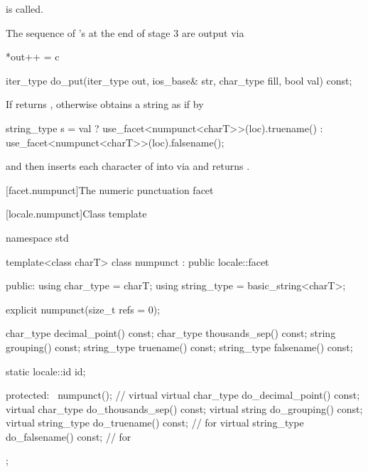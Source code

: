 \begin{itemdescr}
\begin{description}
is called.

The sequence of
's
at the end of stage 3 are output via

\begin{codeblock}
*out++ = c
\end{codeblock}
\end{description}
\end{itemdescr}

%
\begin{itemdecl}
iter_type do_put(iter_type out, ios_base& str, char_type fill, bool val) const;
\end{itemdecl}

\begin{itemdescr}
\pnum
\returns
If
returns
,
otherwise obtains a string
as if by
\begin{codeblock}
string_type s =
  val ? use_facet<numpunct<charT>>(loc).truename()
      : use_facet<numpunct<charT>>(loc).falsename();
\end{codeblock}
and then inserts each character
of
into
via
and returns
.
\end{itemdescr}

[facet.numpunct]{The numeric punctuation facet}

[locale.numpunct]{Class template }

%
\begin{codeblock}
namespace std {
  template<class charT>
    class numpunct : public locale::facet {
    public:
      using char_type   = charT;
      using string_type = basic_string<charT>;

      explicit numpunct(size_t refs = 0);

      char_type    decimal_point()   const;
      char_type    thousands_sep()   const;
      string       grouping()        const;
      string_type  truename()        const;
      string_type  falsename()       const;

      static locale::id id;

    protected:
      ~numpunct();                // virtual
      virtual char_type    do_decimal_point() const;
      virtual char_type    do_thousands_sep() const;
      virtual string       do_grouping()      const;
      virtual string_type  do_truename()      const;      // for 
      virtual string_type  do_falsename()     const;      // for 
    };
}
\end{codeblock}

